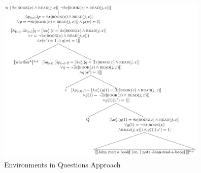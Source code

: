 \begin{frame}[t]
    \subsectionpage\vskip 9pt\vfill
\begin{figure}
    \centering
    \includegraphics[height=8cm]{graphics/questions-guerzonisharvit2014.png}
    \caption{Environments in Questions Approach}
\end{figure}\vfill
\end{frame}